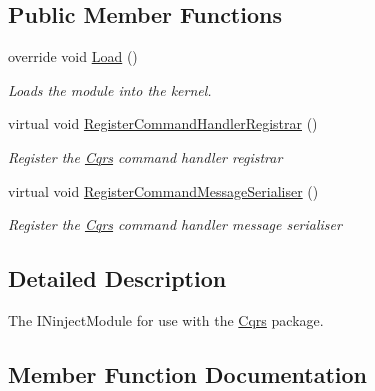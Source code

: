 \subsection*{Public Member Functions}
\begin{DoxyCompactItemize}
\item 
override void \hyperlink{classCqrs_1_1Azure_1_1EventHub_1_1CommandBus_1_1Configuration_1_1AzureCommandBusReceiverModule_a3cad31c47c77dd2f964bf8e47b10f61f_a3cad31c47c77dd2f964bf8e47b10f61f}{Load} ()
\begin{DoxyCompactList}\small\item\em Loads the module into the kernel. \end{DoxyCompactList}\item 
virtual void \hyperlink{classCqrs_1_1Azure_1_1EventHub_1_1CommandBus_1_1Configuration_1_1AzureCommandBusReceiverModule_a62975fe00dd6c7f62b5eba6bb6eed7c4_a62975fe00dd6c7f62b5eba6bb6eed7c4}{Register\+Command\+Handler\+Registrar} ()
\begin{DoxyCompactList}\small\item\em Register the \hyperlink{namespaceCqrs}{Cqrs} command handler registrar \end{DoxyCompactList}\item 
virtual void \hyperlink{classCqrs_1_1Azure_1_1EventHub_1_1CommandBus_1_1Configuration_1_1AzureCommandBusReceiverModule_a03805080424e87926083c35d45ffc550_a03805080424e87926083c35d45ffc550}{Register\+Command\+Message\+Serialiser} ()
\begin{DoxyCompactList}\small\item\em Register the \hyperlink{namespaceCqrs}{Cqrs} command handler message serialiser \end{DoxyCompactList}\end{DoxyCompactItemize}


\subsection{Detailed Description}
The I\+Ninject\+Module for use with the \hyperlink{namespaceCqrs}{Cqrs} package. 



\subsection{Member Function Documentation}
\mbox{\label{classCqrs_1_1Azure_1_1EventHub_1_1CommandBus_1_1Configuration_1_1AzureCommandBusReceiverModule_a3cad31c47c77dd2f964bf8e47b10f61f_a3cad31c47c77dd2f964bf8e47b10f61f}} 
